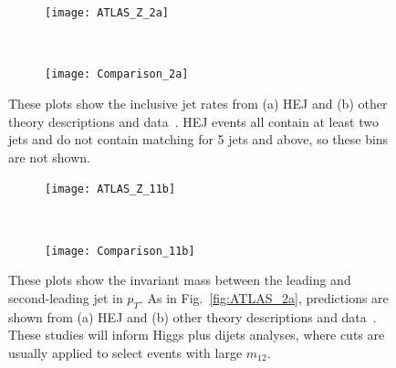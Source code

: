 			\begin{figure}[H]
			  \centering
			  \begin{subfigure}[b]{0.48\textwidth}
			    \texttt{[image: ATLAS\_Z\_2a]}
			    \label{fig:HEJ_ATLAS_2a}
			  \end{subfigure}
			  ~
			  \begin{subfigure}[b]{0.48\textwidth}
			    \texttt{[image: Comparison\_2a]}
			    \caption{}
			    \label{fig:MC_ATLAS_2a}
			  \end{subfigure}
			  \caption{These plots show the inclusive jet rates from (a) HEJ and (b) other
			    theory descriptions and data~\cite{Aad:2013ysa}.  HEJ events all contain at
			    least two jets and do not contain matching for 5 jets and above, so these
			    bins are not shown.}
			  \label{fig:ATLAS_2a}

			  \begin{subfigure}[b]{0.48\textwidth}
			    \texttt{[image: ATLAS\_Z\_11b]}
			    \caption{}
			    \label{fig:HEJ_ATLAS_11b}
			  \end{subfigure}
			  ~
			  \begin{subfigure}[b]{0.48\textwidth}
			    \texttt{[image: Comparison\_11b]}
			    \caption{}
			    \label{fig:MC_ATLAS_11b}
			  \end{subfigure}
			  \caption{These plots show the invariant mass between the leading and
			    second-leading jet in $p_T$.  As in Fig.~\ref{fig:ATLAS_2a}, predictions are
			    shown from (a) HEJ and (b) other theory descriptions and
			    data~\cite{Aad:2013ysa}. These studies will inform Higgs plus dijets
			    analyses, where cuts are usually applied to select events with large
			    $m_{12}$.}
			  \label{fig:ATLAS_11b}
			\end{figure}

